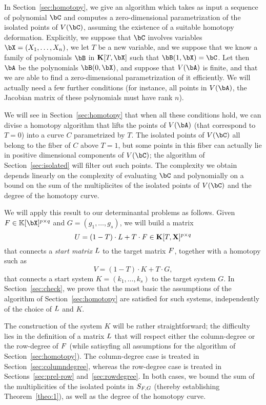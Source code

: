 \documentclass[12pt]{article}
\begin{document}
In Section~\ref{sec:homotopy}, we give an algorithm which takes as
input a sequence of polynomial $\bC$ and computes a zero-dimensional
parametrization of the isolated points of $V(\bC)$, assuming the
existence of a suitable homotopy deformation. Explicitly, we suppose
that $\bC$ involves variables $\bX=(X_1,\dots,X_n)$, we let $T$ be a
new variable, and we suppose that we know a family of polynomials
$\bB$ in $\KK[T,\bX]$ such that $\bB(1,\bX)=\bC$. Let then $\bA$ be
the polynomials $\bB(0,\bX)$, and suppose that $V(\bA)$ is finite, and
that we are able to find a zero-dimensional parametrization of it
efficiently. We will actually need a few further conditions (for
instance, all points in $V(\bA)$, the Jacobian matrix of these
polynomials must have rank $n$).

We will see in Section~\ref{sec:homotopy} that when all these
conditions hold, we can divise a homotopy algorithm that lifts the
points of $V(\bA)$ (that correspond to $T=0$) into a curve $C$
parametrized by $T$. The isolated points of $V(\bC)$ all belong to the
fiber of $C$ above $T=1$, but some points in this fiber can actually
lie in positive dimensional components of $V(\bC)$; the algorithm of
Section~\ref{sec:isolated} will filter out such points. The complexity
we obtain depends linearly on the complexity of evaluating $\bC$ and
polynomially on a bound on the sum of the multiplicites of the
isolated points of $V(\bC)$ and the degree of the homotopy curve.

We will apply this result to our determinantal problems as
follows. Given $\mF \in \K[\bX]^{p \times q}$ and $G=(g_1,\dots,g_s)$,
we will build a matrix
\[{U} = (1-T)\cdot {L} + T \cdot {F} \in \mathbf{K}[T, \mathbf{X}]^{p \times q}\]
that connects a \emph{start matrix} ${L}$ to the target matrix ${F}$,
together with a homotopy such as
\[V = (1-T) \cdot K + T \cdot G,\]
that connects a start system $K=(k_1,\dots,k_s)$ to the target system
$G$.  In Section~\ref{sec:check}, we prove that the most basic the
assumptions of the algorithm of Section~\ref{sec:homotopy} are
satisfied for such systems, independently of the choice of ${L}$ and
$K$.

The construction of the system $K$ will be rather straightforward; the
difficulty lies in the definition of a matrix ${L}$ that will respect
either the column-degree or the row-degree of ${F}$ (while satisyfing
all assumptions for the algorithm of Section~\ref{sec:homotopy}).  The
column-degree case is treated in Section~\ref{sec:columndegree},
whereas the row-degree case is treated in Sections~\ref{sec:prel-row}
and~\ref{sec:rowdegree}. In both cases, we bound the sum of the
multiplicities of the isolated points in $S_{{F}, G}$ (thereby
establishing Theorem~\ref{theo:1}), as well as the degree of the
homotopy curve. 
\end{document}
